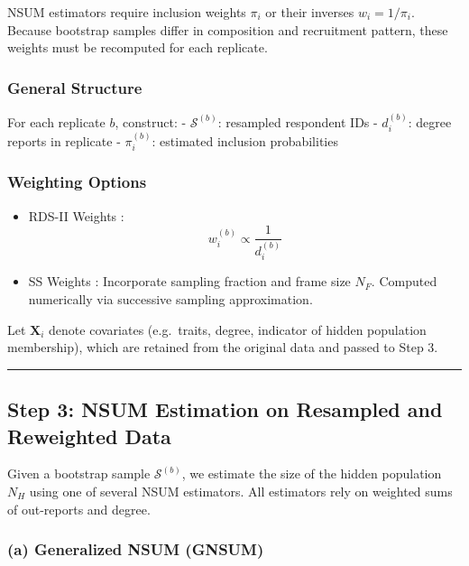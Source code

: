 \documentclass[
  12pt,
  letterpaper,
  DIV=11,
  numbers=noendperiod]{scrartcl}
\theoremstyle{plain}
\theoremstyle{definition}
\begin{document}
NSUM estimators require inclusion weights \(\pi_i\) or their inverses
\(w_i = 1 / \pi_i\). Because bootstrap samples differ in composition and
recruitment pattern, these weights must be recomputed for each
replicate.

\subsubsection{General Structure}\label{general-structure}

For each replicate \(b\), construct: - \(\mathcal{S}^{(b)}\): resampled
respondent IDs - \(d_i^{(b)}\): degree reports in replicate -
\(\pi_i^{(b)}\): estimated inclusion probabilities

\subsubsection{Weighting Options}\label{weighting-options}

\begin{itemize}
\item
  RDS-II Weights \autocite{volz08-probability}: \[
  w_i^{(b)} \propto \frac{1}{d_i^{(b)}}
  \]
\item
  SS Weights \autocite{gile11-improved}: Incorporate sampling fraction
  and frame size \(N_F\). Computed numerically via successive sampling
  approximation.
\end{itemize}

Let \(\mathbf{X}_i\) denote covariates (e.g.~traits, degree, indicator
of hidden population membership), which are retained from the original
data and passed to Step 3.

\begin{center}\rule{0.5\linewidth}{0.5pt}\end{center}

\subsection{Step 3: NSUM Estimation on Resampled and Reweighted
Data}\label{step-3-nsum-estimation-on-resampled-and-reweighted-data}

Given a bootstrap sample \(\mathcal{S}^{(b)}\), we estimate the size of
the hidden population \(N_H\) using one of several NSUM estimators. All
estimators rely on weighted sums of out-reports and degree.

\subsubsection{(a) Generalized NSUM
(GNSUM)}\label{a-generalized-nsum-gnsum}
\end{document}
